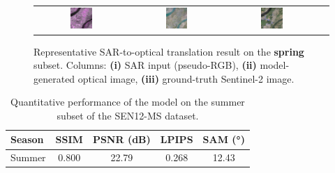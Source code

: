 \begin{figure}[h!]
\begin{tabular}{c *{3}{c}}
        \includegraphics[width=0.25\textwidth]{img/seasons/spring/sample_000091_sar_pseudo.png} &
        \includegraphics[width=0.25\textwidth]{img/seasons/spring/sample_000091_pred_rgb.png} &
        \includegraphics[width=0.25\textwidth]{img/seasons/spring/sample_000091_true_rgb.png} \\
    \end{tabular}
    \caption[Qualitative results on the spring subset]{%
    Representative SAR-to-optical translation result on the \textbf{spring} subset. 
    Columns: \textbf{(i)} SAR input (pseudo-RGB), 
    \textbf{(ii)} model-generated optical image, 
    \textbf{(iii)} ground-truth Sentinel-2 image.
    }
    \label{fig:appendix_spring}
\end{figure}


\newpage

\vspace{2em} 

\begin{table}[h!]
\centering
\caption[Quantitative results on the summer subset]{Quantitative performance of the model on the summer subset of the SEN12-MS dataset.}
\begin{tabular}{lcccc}
\toprule
\textbf{Season} & \textbf{SSIM} & \textbf{PSNR (dB)} & \textbf{LPIPS} & \textbf{SAM (°)} \\
\midrule
Summer & 0.800 & 22.79 & 0.268 & 12.43 \\
\bottomrule
\end{tabular}
\label{tab:summer_results}
\end{table}

